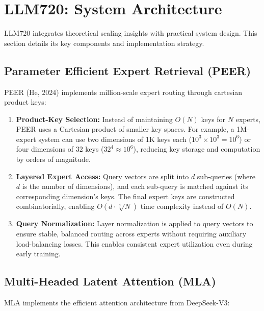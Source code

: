\documentclass[11pt]{article}
\begin{document}
\section{LLM720: System Architecture}\label{sec:system}

LLM720 integrates theoretical scaling insights with practical system design. This section details its key components and implementation strategy.

\subsection{Parameter Efficient Expert Retrieval (PEER)}

PEER (He, 2024) implements million-scale expert routing through cartesian product keys:

\begin{enumerate}
    \item \textbf{Product-Key Selection:} Instead of maintaining $O(N)$ keys for $N$ experts, PEER uses a Cartesian product of smaller key spaces. For example, a 1M-expert system can use two dimensions of 1K keys each ($10^3 \times 10^3 = 10^6$) or four dimensions of 32 keys ($32^4 \approx 10^6$), reducing key storage and computation by orders of magnitude.
    
    \item \textbf{Layered Expert Access:} Query vectors are split into $d$ sub-queries (where $d$ is the number of dimensions), and each sub-query is matched against its corresponding dimension's keys. The final expert keys are constructed combinatorially, enabling $O(d \cdot \sqrt[d]{N})$ time complexity instead of $O(N)$.
    
    \item \textbf{Query Normalization:} Layer normalization is applied to query vectors to ensure stable, balanced routing across experts without requiring auxiliary load-balancing losses. This enables consistent expert utilization even during early training.
\end{enumerate}

\subsection{Multi-Headed Latent Attention (MLA)}

MLA implements the efficient attention architecture from DeepSeek-V3:
\end{document}
